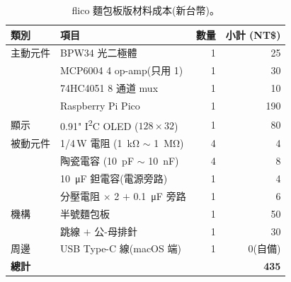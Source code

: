 \documentclass[12pt,a4paper]{article}
\begin{document}
\begin{table}[H]
	\centering
	\caption{flico 麵包板版材料成本(新台幣)。}
	\label{tab:cost}
	\begin{tabular}{llrr}
		\toprule
		類別                              & 項目                                                        & 數量         & 小計 (NT\$) \\
		\midrule
		主動元件                            & BPW34 光二極體                                                & 1          & 25        \\
		                                & MCP6004 4 op-amp(只用 1)                                    & 1          & 30        \\
		                                & 74HC4051 8 通道 mux                                         & 1          & 10        \\
		                                & Raspberry Pi Pico                                         & 1          & 190       \\
		顯示                              & 0.91" I\textsuperscript{2}C OLED (\(128 \times 32\))      & 1          & 80        \\
		被動元件                            & 1/4\,W 電阻 (\SI{1}{\kilo\ohm} \(\sim\) \SI{1}{\mega\ohm})  & 4          & 4         \\
		                                & 陶瓷電容 (\SI{10}{\pico\farad} \(\sim\) \SI{10}{\nano\farad}) & 4          & 8         \\
		                                & \SI{10}{\micro\farad} 鉭電容(電源旁路)                           & 1          & 4         \\
		                                & 分壓電阻 \(\times\) 2 \(+\) \SI{0.1}{\micro\farad} 旁路         & 1 \text{組} & 6         \\
		機構                              & 半號麵包板                                                     & 1          & 50        \\
		                                & 跳線 \(+\) 公-母排針                                            & 1 \text{組} & 30        \\
		周邊                              & USB Type-C 線(macOS 端)                                     & 1          & 0(自備)     \\
		\midrule
		\multicolumn{3}{l}{\textbf{總計}} & \textbf{435}                                                                       \\
		\bottomrule
	\end{tabular}
\end{table}
\end{document}
